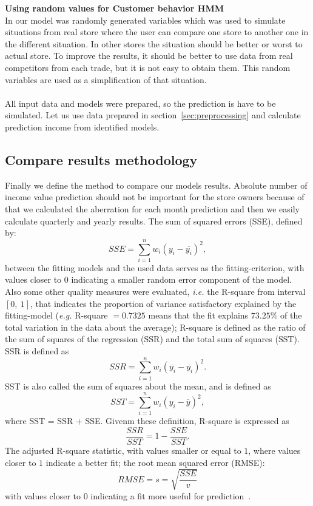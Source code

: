 \textbf{Using random values for Customer behavior HMM}\\
In our model was randomly generated variables which was used to simulate situations from real store where the user can compare one store to another one in the different situation.
In other stores the situation should be better or worst to actual store.
To improve the results, it should be better to use data from real competitors from each trade, but it is not easy to obtain them.
This random variables are used as a simplification of that situation.\\
\\
All input data and models were prepared, so the prediction is have to be simulated.
Let us use data prepared in section~\ref{sec:preprocessing} and calculate prediction income from identified models.
\subsection{Compare results methodology} \label{subsec:result_metodology}
Finally we define the method to compare our models results.
Absolute number of income value prediction should not be important for the store owners because of that we calculated the aberration for each month
prediction and then we easily calculate quarterly and yearly results.
The sum of squared errors (SSE), defined by:
$$SSE = \sum^n_{i=1}w_i(y_i - \overline{y_i})^2,$$
between the fitting models and the used data serves as the fitting-criterion,
with values closer to $0$ indicating a smaller random error component of the model.
Also some other quality measures were evaluated, \textit{i.e.} the R-square from interval $[0,\ 1]$,
that indicates the proportion of variance satisfactory explained by the fitting-model (\textit{e.g.}  R-square $= 0.7325$ means
that the fit explains $73.25\%$ of the total variation in the data about the average);
R-square is defined as the ratio of the sum of squares of the regression (SSR) and the total sum of squares (SST).
SSR is defined as
$$SSR = \sum_{i=1}^nw_i(\overline{y_i} - \overline{y_i})^2.$$
SST is also called the sum of squares about the mean, and is defined as
$$SST = \sum_{i=1}^nw_i(y_i - \overline{y})^2,$$
where SST = SSR + SSE. Givenm these definition, R-square is expressed as
$$\frac{SSR}{SST} = 1 - \frac{SSE}{SST}.$$
The adjusted R-square statistic, with values smaller or equal to $1$, where values closer to $1$ indicate a better fit; the root mean squared error (RMSE):\\
$$RMSE = s = \sqrt{\frac{SSE}{v}}$$
with values closer to $0$ indicating a fit more useful for prediction~\cite{cftool}.
